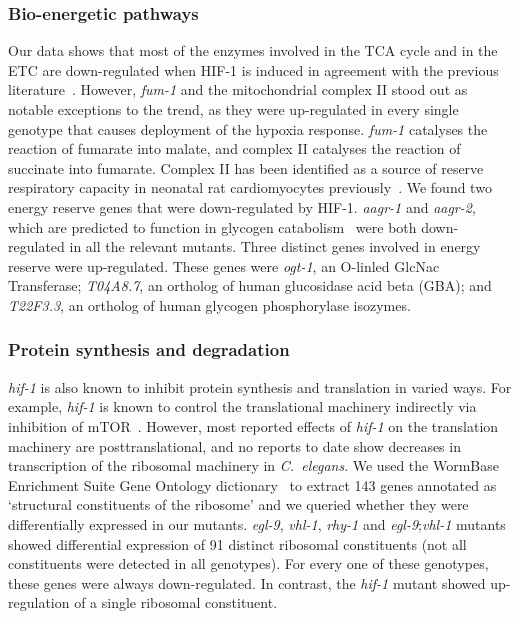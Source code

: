 \documentclass[9pt,twocolumn,twoside]{pnas-new}
\newcommand{\cel}{\emph{C.~elegans}}
\newcommand{\gene}[1]{\emph{#1}}
\newcommand{\egl}{\emph{egl-9}}
\newcommand{\rhy}{\emph{rhy-1}}
\newcommand{\vhl}{\emph{vhl-1}}
\newcommand{\hif}{\emph{hif-1}}
\newcommand{\hifp}{HIF-1}
\begin{document}
\subsubsection{Bio-energetic pathways}

Our data shows that most of the enzymes involved in the TCA cycle and in the ETC
are down-regulated when \hifp{} is induced in agreement with the previous
literature~\cite{Semenza2012}. However,
\gene{fum-1} and the mitochondrial complex II stood out as notable exceptions to
the trend, as they were up-regulated in every single genotype that causes
deployment of the hypoxia response. \gene{fum-1} catalyses the reaction of
fumarate into malate, and complex II catalyses the reaction of succinate into
fumarate. Complex II has been identified as a source of reserve respiratory capacity
in neonatal rat cardiomyocytes previously~\cite{Pfleger2015}.
We found two energy reserve genes that were down-regulated by \hifp{}. \gene{aagr-1}
and \gene{aagr-2}, which are predicted to function in glycogen
catabolism~\cite{Sikora2010} were both down-regulated in all the relevant mutants.
Three distinct genes involved in energy reserve were up-regulated. These genes were
\gene{ogt-1}, an O-linled GlcNac Transferase; \gene{T04A8.7}, an ortholog of human
glucosidase acid beta (GBA); and \gene{T22F3.3}, an ortholog of human glycogen
phosphorylase isozymes.

\subsubsection{Protein synthesis and degradation}

\hif{} is also known to inhibit protein synthesis and translation in varied ways.
For example, \hif{} is known to control the translational machinery indirectly
via inhibition of mTOR~\cite{Brugarolas2004}. However, most reported effects of
\hif{} on the translation machinery are posttranslational, and no reports to date
show decreases in transcription of the ribosomal machinery in \cel{}. We used
the WormBase Enrichment Suite Gene Ontology dictionary~\cite{} to extract 143 genes
annotated as `structural constituents of the ribosome' and we queried whether they
were differentially expressed in our mutants. \egl{}, \vhl{}, \rhy{} and
\egl{};\vhl{} mutants showed differential expression of 91 distinct ribosomal
constituents (not all constituents were detected in all genotypes). For every one
of these genotypes, these genes were always down-regulated. In contrast, the
\hif{} mutant showed up-regulation of a single ribosomal constituent.
\end{document}
